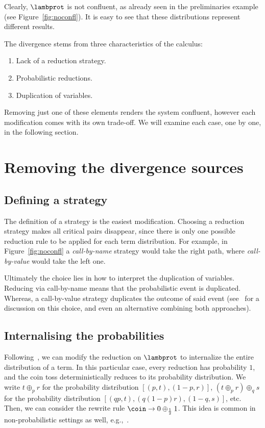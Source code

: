 Clearly, $\lambprot$ is not confluent, as already seen in the preliminaries example (see Figure~\ref{fig:noconfl}). It is easy to see that these distributions represent different results.

The divergence stems from three characteristics of the calculus:
\begin{enumerate}
  \item Lack of a reduction strategy.
  \item Probabilistic reductions.
  \item Duplication of variables.
\end{enumerate}
  
Removing just one of these elements renders the system confluent, however each modification comes with its own trade-off. We will examine each case, one by one, in the following section.

\section{Removing the divergence sources}
\subsection{Defining a strategy}\label{sec:strategy}
The definition of a strategy is the easiest modification. Choosing a reduction strategy makes all critical pairs disappear, since there is only one possible reduction rule to be applied for each term distribution. For example, in Figure~\ref{fig:noconfl} a \textit{call-by-name} strategy would take the right path, where \textit{call-by-value} would take the left one. 

Ultimately the choice lies in how to interpret the duplication of variables. Reducing via call-by-name means that the probabilistic event is duplicated. Whereas, a call-by-value strategy duplicates the outcome of said event (see~\cite{Dallago} for a discussion on this choice, and even an alternative combining both approaches).

\subsection{Internalising the probabilities}\label{sec:circulito}
Following~\cite{lambdarho}, we can modify the reduction on $\lambprot$ to internalize the entire distribution of a term. In this particular case, every reduction has probability $1$, and the coin toss deterministically reduces to its probability distribution.
We write $t\oplus_{p}r$ for the probability distribution $[(p,t),(1-p,r)]$, $(t\oplus_p r)\oplus_q s$ for the probability distribution $[(qp,t),(q(1-p)r),(1-q,s)]$, etc. Then, we can consider the rewrite rule
\(
  \coin\to 0 \oplus_{\frac 12} 1
\).
This idea is common in non-probabilistic settings as well, e.g.,~\cite{AlvesDunduaFloridoKutsiaIGPL18}.


